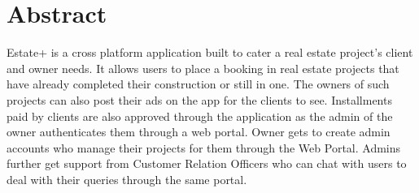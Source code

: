 \chapter*{Abstract}
Estate+ is a cross platform application built to cater a real estate project’s
client and owner needs. It allows users to place a booking in real estate projects
that have already completed their construction or still in one. The owners of
such projects can also post their ads on the app for the clients to see. Installments paid by clients are also approved through the application as the admin
of the owner authenticates them through a web portal. Owner gets to create
admin accounts who manage their projects for them through the Web Portal.
Admins further get support from Customer Relation Officers who can chat with
users to deal with their queries through the same portal.